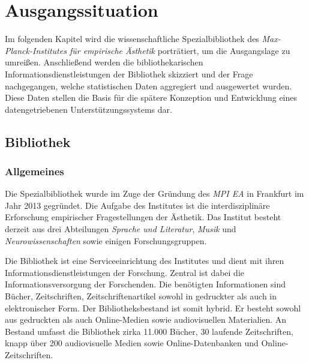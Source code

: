 \chapter{Ausgangssituation}
\label{chap:three}
Im folgenden Kapitel wird die wissenschaftliche Spezialbibliothek des \textit{Max-Planck-Institutes für empirische Ästhetik} porträtiert, um die Ausgangslage zu umreißen.
Anschließend werden die bibliothekarischen Informationsdienstleistungen der Bibliothek skizziert und der Frage nachgegangen, 
welche statistischen Daten aggregiert und ausgewertet wurden. Diese Daten stellen die Basis für die spätere Konzeption und Entwicklung eines datengetriebenen Unterstützungssystems dar.

\section{Bibliothek}
\label{chap:three_one}
\subsection{Allgemeines}
Die Spezialbibliothek wurde im Zuge der Gründung des \textit{\acrshort{MPI EA}}
in Frankfurt im Jahr 2013 gegründet. Die Aufgabe des Institutes ist die interdisziplinäre Erforschung 
empirischer Fragestellungen der Ästhetik. Das Institut besteht derzeit aus drei Abteilungen \textit{Sprache und Literatur}, 
\textit{Musik} und \textit{Neurowissenschaften} sowie einigen Forschungsgruppen. %



Die Bibliothek ist eine Serviceeinrichtung des Institutes und dient mit ihren Informationsdienstleistungen 
der Forschung.
Zentral ist dabei die Informationsversorgung der Forschenden. Die benötigten Informationen sind Bücher, 
Zeitschriften, Zeitschriftenartikel sowohl in gedruckter als auch in elektronischer Form.
Der Bibliotheksbestand ist somit hybrid. Er besteht sowohl aus gedruckten als auch Online-Medien sowie 
audiovisuellen Materialien. An Bestand umfasst die Bibliothek zirka 11.000 Bücher, 30 laufende Zeitschriften, 
knapp über 200 audiovisuelle Medien sowie Online-Datenbanken
und Online-Zeitschriften.


